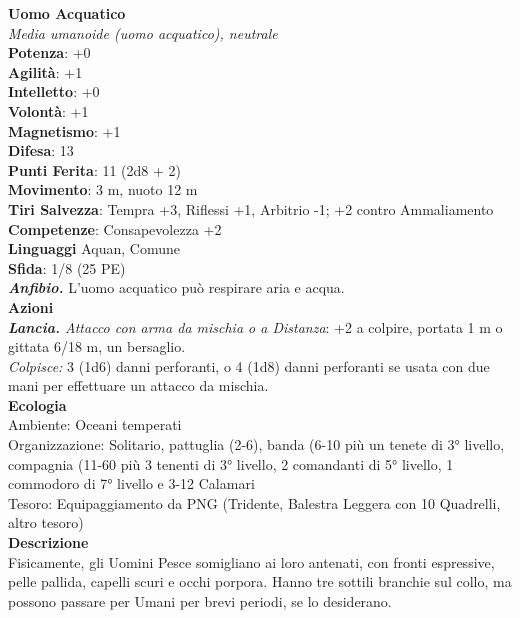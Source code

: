 \begin{multicols}{2}
\medskip\textbf{Uomo Acquatico}\\
\emph{Media umanoide (uomo acquatico), neutrale}\\
\textbf{Potenza}: +0\\
\textbf{Agilità}: +1\\
\textbf{Intelletto}: +0\\
\textbf{Volontà}: +1\\
\textbf{Magnetismo}: +1\\
\textbf{Difesa}: 13\\
\textbf{Punti Ferita}: 11 (2d8 + 2)\\
\textbf{Movimento}: 3 m, nuoto 12 m\\
\textbf{Tiri Salvezza}:  Tempra +3, Riflessi +1, Arbitrio -1; +2 contro Ammaliamento\\
\textbf{Competenze}: Consapevolezza +2\\
\textbf{Linguaggi} Aquan, Comune\\
\textbf{Sfida}: 1/8 (25 PE)\smallskip\\
\emph{\textbf{Anfibio.}} L'uomo acquatico può respirare aria e acqua.\\
\smallskip\textbf{Azioni}\\
\emph{\textbf{Lancia.} Attacco con arma da mischia o a Distanza}: +2 a colpire, portata 1 m o gittata 6/18 m, un bersaglio.\\
\emph{Colpisce:} 3 (1d6) danni perforanti, o 4 (1d8) danni perforanti se usata con due mani per effettuare un attacco da mischia.\\
\textbf{Ecologia}\\
Ambiente: Oceani temperati\\
Organizzazione: Solitario, pattuglia (2-6), banda (6-10 più un tenete di 3° livello, compagnia (11-60 più 3 tenenti di 3° livello, 2 comandanti di 5° livello, 1 commodoro di 7° livello e 3-12 Calamari\\
Tesoro: Equipaggiamento da PNG (Tridente, Balestra Leggera con 10 Quadrelli, altro tesoro)\\
\textbf{Descrizione}\\
Fisicamente, gli Uomini Pesce somigliano ai loro antenati, con fronti espressive, pelle pallida, capelli scuri e occhi porpora. Hanno tre sottili branchie sul collo, ma possono passare per Umani per brevi periodi, se lo desiderano.\\


\end{multicols}
